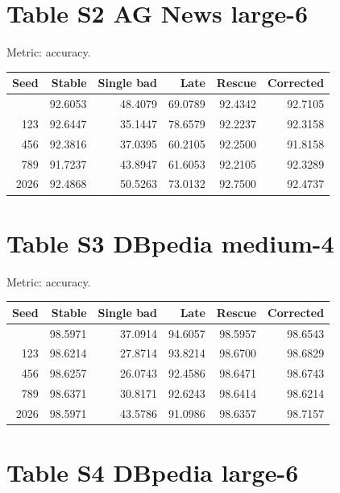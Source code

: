 \documentclass[11pt,a4paper]{article}
\begin{document}

\section{Table S2 AG News large-6}\label{table-s2-ag-news-large-6}

Metric: accuracy.

\begin{longtable}[]{@{}rrrrrr@{}}
\toprule\noalign{}
Seed & Stable & Single bad & Late & Rescue & Corrected \\
\midrule\noalign{}
\endhead
\bottomrule\noalign{}
\endlastfoot
42 & 92.6053 & 48.4079 & 69.0789 & 92.4342 & 92.7105 \\
123 & 92.6447 & 35.1447 & 78.6579 & 92.2237 & 92.3158 \\
456 & 92.3816 & 37.0395 & 60.2105 & 92.2500 & 91.8158 \\
789 & 91.7237 & 43.8947 & 61.6053 & 92.2105 & 92.3289 \\
2026 & 92.4868 & 50.5263 & 73.0132 & 92.7500 & 92.4737 \\
\end{longtable}


\section{Table S3 DBpedia medium-4}\label{table-s3-dbpedia-medium-4}

Metric: accuracy.

\begin{longtable}[]{@{}rrrrrr@{}}
\toprule\noalign{}
Seed & Stable & Single bad & Late & Rescue & Corrected \\
\midrule\noalign{}
\endhead
\bottomrule\noalign{}
\endlastfoot
42 & 98.5971 & 37.0914 & 94.6057 & 98.5957 & 98.6543 \\
123 & 98.6214 & 27.8714 & 93.8214 & 98.6700 & 98.6829 \\
456 & 98.6257 & 26.0743 & 92.4586 & 98.6471 & 98.6743 \\
789 & 98.6371 & 30.8171 & 92.6243 & 98.6414 & 98.6214 \\
2026 & 98.5971 & 43.5786 & 91.0986 & 98.6357 & 98.7157 \\
\end{longtable}


\section{Table S4 DBpedia large-6}\label{table-s4-dbpedia-large-6}
\end{document}
